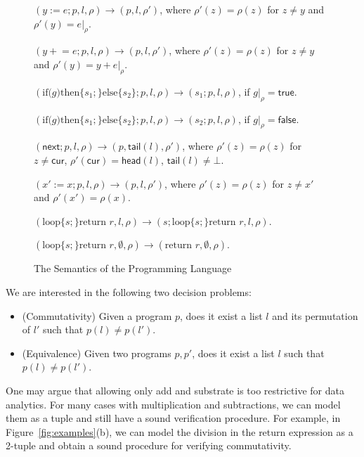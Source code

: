 \documentclass[runningheads,a4paper]{llncs}
\newcommand\cur{\mathsf{cur}}
\newcommand\next{\mathsf{next}}
\newcommand\head{\mathsf{head}}
\newcommand\tail{\mathsf{tail}}
\newcommand{\loopL}[1]{\mbox{loop\{} #1\mbox{\}}}
\newcommand{\ite}[3]{\mbox{if(} #1 \mbox{)then\{} #2\mbox{\}else\{}#3\mbox{\}}}
\newcommand\ltrue{\mathsf{true}}
\newcommand\lfalse{\mathsf{false}}
\newcommand\addeq{+\!\!=}
\newcommand{\sub}[2]{#1|_{#2}}
\begin{document}
\begin{figure}
	\centering
$(y := e;p, l, \rho) \longrightarrow (p, l, \rho')$, where $\rho'(z) =\rho(z)$ for $z\neq y$ and $\rho'(y) = \sub{e}{\rho}$.

$(y \addeq e;p, l, \rho) \longrightarrow (p, l, \rho')$, where $\rho'(z) =\rho(z)$ for $z\neq y$ and $\rho'(y) = \sub{y+e}{\rho}$.

$(\ite{g}{s_1;}{s_2};p, l, \rho) \longrightarrow (s_1;p, l, \rho)$, if $\sub{g}{\rho} =\ltrue$.

$(\ite{g}{s_1;}{s_2};p, l, \rho) \longrightarrow (s_2;p, l, \rho)$, if $\sub{g}{\rho} =\lfalse$.

$(\next;p, l, \rho) \longrightarrow (p, \tail(l), \rho')$, where $\rho'(z) =\rho(z)$ for $z\neq \cur$, $\rho'(\cur) = \head(l)$, $\tail(l)\neq \bot$.

$(x':=x;p, l, \rho) \longrightarrow (p, l, \rho')$, where $\rho'(z) =\rho(z)$ for $z\neq x'$ and $\rho'(x') = \rho(x)$.

$(\loopL{s;}\mbox{return }r, l, \rho) \longrightarrow (s;\loopL{s;}\mbox{return }r, l, \rho)$.

$(\loopL{s;}\mbox{return }r, \emptyset, \rho) \longrightarrow (\mbox{return }r,  \emptyset, \rho)$.
	\label{fig:semantics}
	\caption{The Semantics of the Programming Language}
\end{figure}

        
We are interested in the following two decision problems:
\begin{itemize}
	\item (Commutativity) Given a program $p$, does it exist a list $l$ and its permutation of $l'$ such that $p(l) \neq p(l')$.
	\item (Equivalence) Given two programs $p,p'$, does it exist a list $l$ such that $p(l)\neq p(l')$.
\end{itemize}


One may argue that allowing only add and substrate is too restrictive for data analytics. For many cases with multiplication and subtractions, we can model them as a tuple and still have a sound verification procedure. For example, in Figure~\ref{fig:examples}(b), we can model the division in the return expression as a 2-tuple and obtain a sound procedure for verifying commutativity. 
\end{document}

